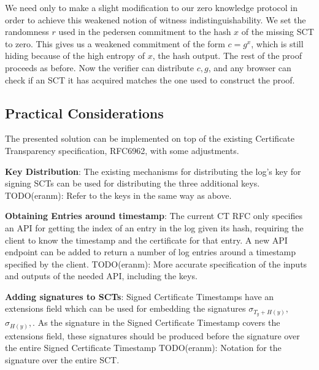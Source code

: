 \documentclass[letterpaper,twocolumn,10pt]{article}
\begin{document}
We need only to make a slight modification to our zero knowledge protocol in order to achieve this weakened notion of witness indistinguishability. We set the randomness $r$ used in the pedersen commitment to the  hash $x$ of the missing SCT to zero. This gives us a weakened commitment of the form $c=g^x$, which is still hiding because of the high entropy of $x$, the hash output. The rest of the proof proceeds as before. Now the verifier can distribute $c,g$, and any browser can check if an SCT it has acquired matches the one used to construct the proof. 

\subsection{Practical Considerations}

The presented solution can be implemented on top of the existing Certificate Transparency specification, RFC6962, with some adjustments.

\textbf{Key Distribution}: The existing mechanisms for distributing the log's key for signing SCTs can be used for distributing the three additional keys. TODO(eranm): Refer to the keys in the same way as above.

\textbf{Obtaining Entries around timestamp}: The current CT RFC only specifies an API for getting the index of an entry in the log given its hash, requiring the client to know the timestamp and the certificate for that entry. A new API endpoint can be added to return a number of log entries around a timestamp specified by the client.
TODO(eranm): More accurate specification of the inputs and outputs of the needed API, including the keys.

\textbf{Adding signatures to SCTs}: Signed Certificate Timestamps have an extensions field which can be used for embedding the signatures $\sigma_{T_y+H(y)},$ $\sigma_{H(y)}, $. As the signature in the Signed Certificate Timestamp covers the extensions field, these signatures should be produced before the signature over the entire Signed Certificate Timestamp TODO(eranm): Notation for the signature over the entire SCT.
\end{document}
